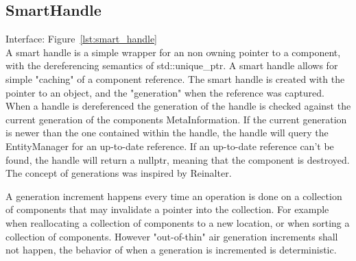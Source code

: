 \subsection{SmartHandle}
Interface: Figure~\ref{lst:smart_handle}\\\noindent
A smart handle is a simple wrapper for an non owning pointer to a component, with the dereferencing semantics of std::unique\_ptr. 
A smart handle allows for simple "caching" of a component reference.
The smart handle is created with the pointer to an object, 
and the "generation" when the reference was captured. 
When a handle is dereferenced the generation of the handle is checked against the current generation of the components MetaInformation. 
If the current generation is newer than the one contained within the handle, 
the handle will query the EntityManager for an up-to-date reference.
If an up-to-date reference can't be found, 
the handle will return a nullptr, meaning that the component is destroyed.
The concept of generations was inspired by Reinalter\cite{molecular_musings_internal_references}.

A generation increment happens every time an operation is done on a collection of components that may invalidate a pointer into the collection.
For example when reallocating a collection of components to a new location,
or when sorting a collection of components.
However "out-of-thin" air generation increments shall not happen, the behavior of when a generation is incremented is deterministic.
